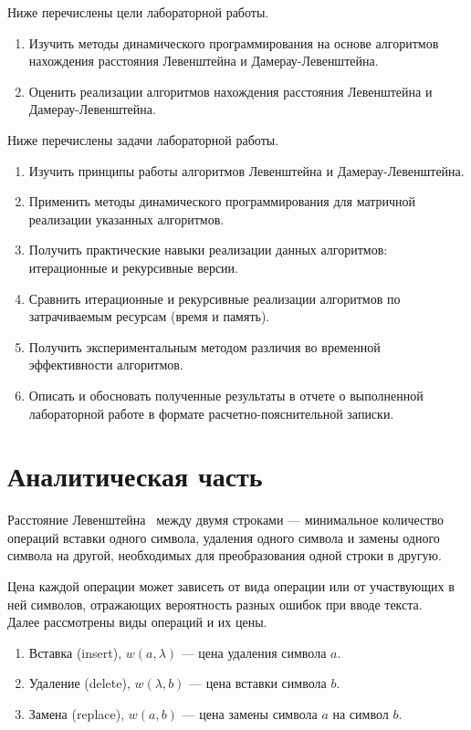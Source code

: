 \documentclass[12pt]{report}
\begin{document}
    Ниже перечислены цели лабораторной работы.
    \begin{enumerate}
        \item Изучить методы динамического программирования на основе алгоритмов нахождения расстояния
        Левенштейна и Дамерау-Левенштейна.
        \item Оценить реализации алгоритмов нахождения расстояния Левенштейна и Дамерау-Левенштейна.
    \end{enumerate}

    Ниже перечислены задачи лабораторной работы.
    \begin{enumerate}
        \item Изучить принципы работы алгоритмов Левенштейна и Дамерау-Левенштейна.
        \item Применить методы динамического программирования для матричной реализации указанных алгоритмов.
        \item Получить практические навыки реализации данных алгоритмов: итерационные и рекурсивные версии.
        \item Сравнить итерационные и рекурсивные реализации алгоритмов по затрачиваемым ресурсам (время и память).
        \item Получить экспериментальным методом различия во временной эффективности алгоритмов.
        \item Описать и обосновать полученные результаты в отчете о выполненной лабораторной работе
        в формате расчетно-пояснительной записки.
    \end{enumerate}

    \newpage


    \chapter{Аналитическая часть}

    Расстояние Левенштейна~\cite{levenshtein} между двумя строками ---
    минимальное количество операций вставки одного символа, удаления одного символа
    и замены одного символа на другой, необходимых для преобразования одной строки в другую.

    Цена каждой операции может зависеть от вида операции или от участвующих в ней символов, отражающих вероятность
    разных ошибок при вводе текста.
    \\
    Далее рассмотрены виды операций и их цены.
    \begin{enumerate}
        \item Вставка (insert), $w(a,\lambda)$ --- цена удаления символа $a$.
        \item Удаление (delete), $w(\lambda, b)$ --- цена вставки символа $b$.
        \item Замена (replace), $w(a, b)$ --- цена замены символа $a$ на символ $b$.
    \end{enumerate}
\end{document}
